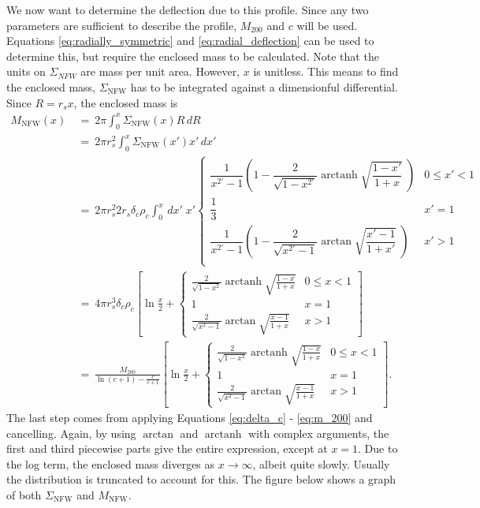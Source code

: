 \documentclass[10pt,twoside]{article}
\theoremstyle{definition}
\theoremstyle{exercise}
\DeclareMathOperator\arctanh{arctanh}
\begin{document}
We now want to determine the deflection due to this profile. Since any two parameters are sufficient to describe the profile, $M_{200}$ and $c$ will be used. Equations \eqref{eq:radially_symmetric} and \eqref{eq:radial_deflection} can be used to determine this, but require the enclosed mass to be calculated. Note that the units on $\Sigma_{NFW}$ are mass per unit area. However, $x$ is unitless. This means to find the enclosed mass, $\Sigma_\text{NFW}$ has to be integrated against a dimensionful differential. Since $R = r_sx$, the enclosed mass is
\begin{align}
		M_\text{NFW}(x) \ &=\ 2\pi \int_0^x \Sigma_\text{NFW}(x) R \, dR\\
		\ &=\ 2 \pi r_s^2 \int_0^x \Sigma_\text{NFW}(x') x' \, dx'\\
		\ &=\ 2\pi r_s^2 2 r_s \delta_c \rho_c 
		\int_0^x \, dx' \; x' 
\begin{cases}
		\dfrac{1}{x^{2'}-1}\left( 1-\dfrac{2}{\sqrt{1-x^{2'}}} \arctanh \sqrt{\dfrac{1-x'}{1+x}}\; \right) & 0 \le x' < 1\\[1.2em]
				\dfrac{1}{3} & x'=1\\[1.2em]
				\dfrac{1}{x^{2'}-1}\left( 1-\dfrac{2}{\sqrt{x^{2'}-1}} \arctan \sqrt{\dfrac{x'-1}{1+x'}}\; \right) &  x' > 1\\
		\end{cases}\\[2em]
		\ &=\ 4\pi r_s^3 \delta_c \rho_c
\left[\ln \frac{x}{2} + 
		\begin{cases}
				\frac{2}{\sqrt{1-x^2}} \arctanh \sqrt{\frac{1-x}{1+x}} & 0 \le x < 1\\[1.2em]
				1 & x = 1\\[1.2em]
				\frac{2}{\sqrt{x^2-1}} \arctan \sqrt{\frac{x-1}{1+x}} & x > 1
						\end{cases}
						\right]\\[2em]
\ &=\ 
\frac{M_{200}}{\ln(c+1) - \frac{c}{c+1}}
\left[\ln \frac{x}{2} + 
		\begin{cases}
				\frac{2}{\sqrt{1-x^2}} \arctanh \sqrt{\frac{1-x}{1+x}} & 0 \le x < 1\\[1.2em]
				1 & x = 1\\[1.2em]
				\frac{2}{\sqrt{x^2-1}} \arctan \sqrt{\frac{x-1}{1+x}} & x > 1
						\end{cases}
						\right].
		\label{eq:NFW_enclosed_mass}
\end{align}
The last step comes from applying Equations \eqref{eq:delta_c} - \eqref{eq:m_200} and cancelling. Again, by using $\arctan$ and $\arctanh$ with complex arguments, the first and third piecewise parts give the entire expression, except at $x =1$. Due to the log term, the enclosed mass diverges as $x \to \infty$, albeit quite slowly. Usually the distribution is truncated to account for this. The figure below shows a graph of both $\Sigma_\text{NFW}$ and $M_\text{NFW}$.
\end{document}
